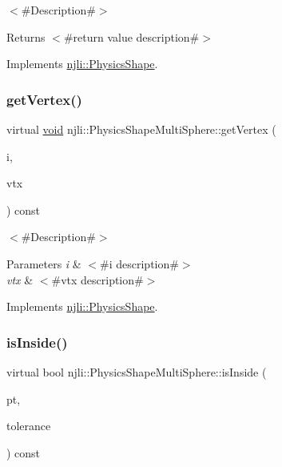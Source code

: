 $<$\#\+Description\#$>$

\begin{DoxyReturn}{Returns}
$<$\#return value description\#$>$ 
\end{DoxyReturn}


Implements \mbox{\hyperlink{classnjli_1_1_physics_shape_ac7c6b2ac373892095f8220d56f8ad6de}{njli\+::\+Physics\+Shape}}.

\mbox{\label{classnjli_1_1_physics_shape_multi_sphere_a467600545bb56fe471cb930f5a7b8aad}} 
\subsubsection{\texorpdfstring{get\+Vertex()}{getVertex()}}
{\footnotesize\ttfamily virtual \mbox{\hyperlink{_thread_8h_af1e856da2e658414cb2456cb6f7ebc66}{void}} njli\+::\+Physics\+Shape\+Multi\+Sphere\+::get\+Vertex (\begin{DoxyParamCaption}\item[{int}]{i,  }\item[{bt\+Vector3 \&}]{vtx }\end{DoxyParamCaption}) const\hspace{0.3cm}{\ttfamily [virtual]}}

$<$\#\+Description\#$>$


\begin{DoxyParams}{Parameters}
{\em i} & $<$\#i description\#$>$ \\
\hline
{\em vtx} & $<$\#vtx description\#$>$ \\
\hline
\end{DoxyParams}


Implements \mbox{\hyperlink{classnjli_1_1_physics_shape_acb05a16bdbfa5cee6dcbab5c253eb78e}{njli\+::\+Physics\+Shape}}.

\mbox{\label{classnjli_1_1_physics_shape_multi_sphere_a839ea1301fdc8e1442f4ab4fb5a7cc30}} 
\subsubsection{\texorpdfstring{is\+Inside()}{isInside()}}
{\footnotesize\ttfamily virtual bool njli\+::\+Physics\+Shape\+Multi\+Sphere\+::is\+Inside (\begin{DoxyParamCaption}\item[{const bt\+Vector3 \&}]{pt,  }\item[{\mbox{\hyperlink{_util_8h_a5f6906312a689f27d70e9d086649d3fd}{f32}}}]{tolerance }\end{DoxyParamCaption}) const\hspace{0.3cm}{\ttfamily [virtual]}}

